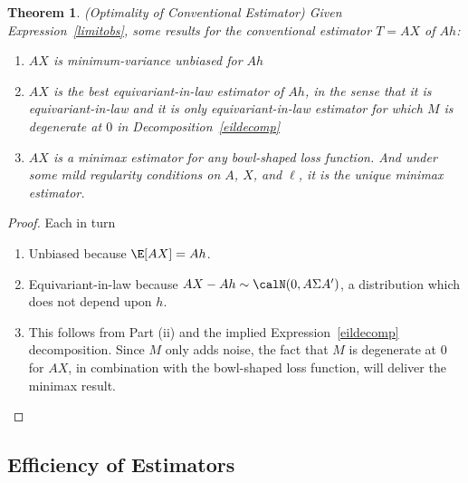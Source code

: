 \documentclass[12pt]{article}
\theoremstyle{plain}
\newtheorem{thm}{Theorem}[section]
\theoremstyle{definition}
\theoremstyle{remark}
\begin{document}
\begin{thm}
\label{normalopt}
\emph{(Optimality of Conventional Estimator)}
Given Expression~\ref{limitobs},
some results for the conventional estimator $T=AX$ of $Ah$:
\begin{enumerate}[label=(\roman*)]
  \item $AX$ is minimum-variance unbiased for $Ah$
  \item $AX$ is the best equivariant-in-law estimator of $Ah$,
    in the sense that it is equivariant-in-law and it is \emph{only}
    equivariant-in-law estimator for which $M$ is degenerate at $0$ in
    Decomposition~\ref{eildecomp}
  \item $AX$ is a minimax estimator for any bowl-shaped loss function.
    And under some mild regularity conditions on $A$, $X$, and $\ell$,
    it is the \emph{unique} minimax estimator.
\end{enumerate}
\end{thm}
\begin{proof}
Each in turn
\begin{enumerate}[label=(\roman*)]
  \item Unbiased because $\E[AX]=Ah$.
  \item Equivariant-in-law because
    $AX-Ah\sim\calN(0,A\Sigma A')$, a distribution which does not depend
    upon $h$.
  \item This follows from Part (ii) and the implied
    Expression~\ref{eildecomp} decomposition.
    Since $M$ only adds noise, the fact that $M$ is degenerate at 0 for
    $AX$, in combination with the bowl-shaped loss function, will
    deliver the minimax result.
\end{enumerate}
\end{proof}





\subsection{Efficiency of Estimators}
\end{document}
